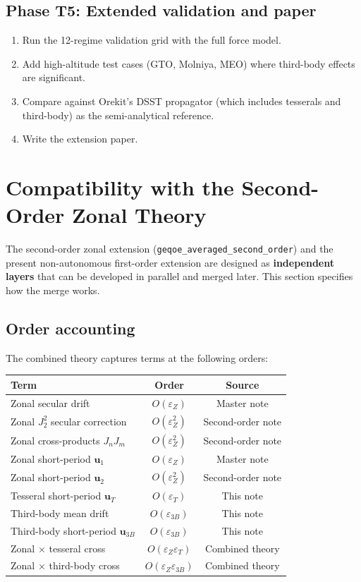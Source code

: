 \documentclass[11pt]{article}
\newcommand{\eps}{\varepsilon}
\newcommand{\secondorder}{geqoe\_averaged\_second\_order}
\begin{document}
\subsection{Phase T5: Extended validation and paper}

\begin{enumerate}
\item Run the 12-regime validation grid with the full force model.
\item Add high-altitude test cases (GTO, Molniya, MEO) where third-body
effects are significant.
\item Compare against Orekit's DSST propagator (which includes tesserals
and third-body) as the semi-analytical reference.
\item Write the extension paper.
\end{enumerate}


\section{Compatibility with the Second-Order Zonal Theory}
\label{sec:combined}

The second-order zonal extension (\texttt{\secondorder{}}) and the present
non-autonomous first-order extension are designed as \textbf{independent
layers} that can be developed in parallel and merged later. This section
specifies how the merge works.

\subsection{Order accounting}

The combined theory captures terms at the following orders:
\begin{center}
\begin{tabular}{lcc}
\toprule
Term & Order & Source \\
\midrule
Zonal secular drift & $O(\eps_Z)$ & Master note \\
Zonal $J_2^2$ secular correction & $O(\eps_Z^2)$ & Second-order note \\
Zonal cross-products $J_n J_m$ & $O(\eps_Z^2)$ & Second-order note \\
Zonal short-period $\bm u_1$ & $O(\eps_Z)$ & Master note \\
Zonal short-period $\bm u_2$ & $O(\eps_Z^2)$ & Second-order note \\
Tesseral short-period $\bm u_T$ & $O(\eps_T)$ & This note \\
Third-body mean drift & $O(\eps_{3B})$ & This note \\
Third-body short-period $\bm u_{3B}$ & $O(\eps_{3B})$ & This note \\
\midrule
Zonal $\times$ tesseral cross & $O(\eps_Z \eps_T)$ & Combined theory \\
Zonal $\times$ third-body cross & $O(\eps_Z \eps_{3B})$ & Combined theory \\
\bottomrule
\end{tabular}
\end{center}
\end{document}
